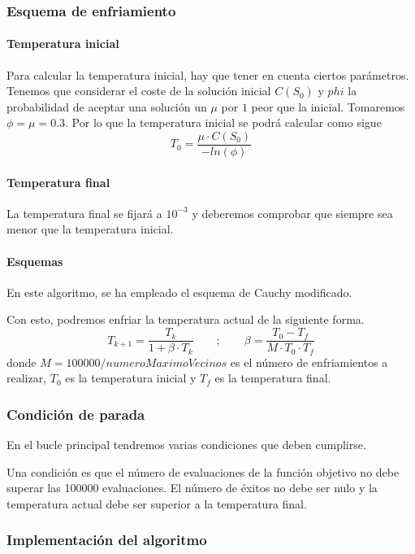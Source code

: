 	\subsubsection{Esquema de enfriamiento}
	
	\paragraph{Temperatura inicial}
	Para calcular la temperatura inicial, hay que tener en cuenta ciertos parámetros.
	Tenemos que considerar el coste de la solución inicial $C(S_0)$ y $phi$ la probabilidad de aceptar 
	una solución un $\mu$ por $1$ peor que la inicial. Tomaremos $\phi = \mu = 0.3$. Por lo que la temperatura 
	inicial se podrá calcular como sigue 
	$$T_0 = \frac{\mu \cdot C(S_0)}{-ln(\phi)}$$

	\paragraph{Temperatura final}
	La temperatura final se fijará a $10^{-3}$ y deberemos comprobar que siempre sea menor que la temperatura inicial.
	
	\paragraph{Esquemas}
	En este algoritmo, se ha empleado el esquema de Cauchy modificado.

	Con esto, podremos enfriar la temperatura actual de la siguiente forma.
	$$T_{k+1} = \frac{T_k}{1 + \beta \cdot T_k} \qquad ; \qquad \beta = \frac{T_0 - T_f}{M\cdot T_0 \cdot T_f}$$
	donde $M = 100000 / numeroMaximoVecinos$ es el número de enfriamientos a realizar, $T_0$ es la temperatura inicial y $T_f$ es 
	la temperatura final.

	\subsubsection{Condición de parada}
	En el bucle principal tendremos varias condiciones que deben cumplirse.

	Una condición es que el número de evaluaciones de la función objetivo no debe superar las 100000 evaluaciones. 
	El número de éxitos no debe ser nulo y la temperatura actual debe ser superior a la temperatura final.

	\subsubsection{Implementación del algoritmo}

